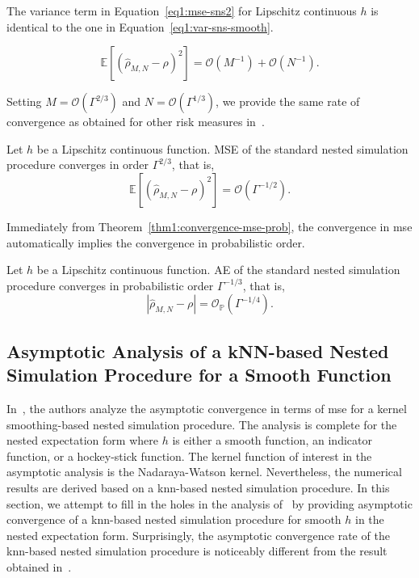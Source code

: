 The variance term in Equation~\eqref{eq1:mse-sns2} for Lipschitz continuous $h$ is identical to the one in Equation~\eqref{eq1:var-sns-smooth}.

\begin{equation}
    \mathbb{E} \left[ \left( \hat{\rho}_{M, N} - \rho \right)^2 \right] = \mathcal{O}(M^{-1}) + \mathcal{O}(N^{-1}).
\end{equation}

Setting $M = \mathcal{O}(\Gamma^{2/3})$ and $N = \mathcal{O}(\Gamma^{1/3})$, we provide the same rate of convergence as obtained for other risk measures in~\cite{gordy2010nested}.

\begin{theorem}
    Let $h$ be a Lipschitz continuous function. 
    MSE of the standard nested simulation procedure converges in order $\Gamma^{2/3}$, that is,
    $$\mathbb{E} \left[ \left( \hat{\rho}_{M, N} - \rho \right)^2 \right] = \mathcal{O}(\Gamma^{-1/2}).$$
\end{theorem}

Immediately from Theorem~\ref{thm1:convergence-mse-prob}, the convergence in \gls{mse} automatically implies the convergence in probabilistic order.

\begin{corollary}
    Let $h$ be a Lipschitz continuous function. AE of the standard nested simulation procedure converges in probabilistic order $\Gamma^{-1/3}$, that is,
    $$\left| \hat{\rho}_{M, N} - \rho \right| = \mathcal{O}_\mathbb{P}(\Gamma^{-1/4}).$$
\end{corollary}

\subsection{Asymptotic Analysis of a kNN-based Nested Simulation Procedure for a Smooth Function}

In~\cite{hong2017kernel}, the authors analyze the asymptotic convergence in terms of \gls{mse} for a kernel smoothing-based nested simulation procedure.
The analysis is complete for the nested expectation form where $h$ is either a smooth function, an indicator function, or a hockey-stick function.
The kernel function of interest in the asymptotic analysis is the Nadaraya-Watson kernel.
Nevertheless, the numerical results are derived based on a \gls{knn}-based nested simulation procedure.
In this section, we attempt to fill in the holes in the analysis of~\cite{hong2017kernel} by providing asymptotic convergence of a \gls{knn}-based nested simulation procedure for smooth $h$ in the nested expectation form.
Surprisingly, the asymptotic convergence rate of the \gls{knn}-based nested simulation procedure is noticeably different from the result obtained in~\cite{hong2017kernel}.

